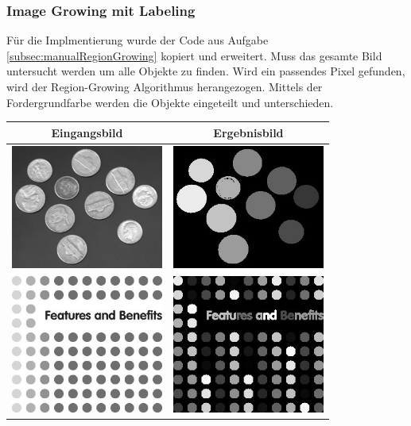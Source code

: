 \documentclass[12pt,german]{article}
\begin{document}
\subsubsection{Image Growing mit Labeling}
Für die Implmentierung wurde der Code aus Aufgabe \ref{subsec:manualRegionGrowing} kopiert und erweitert. Muss das gesamte Bild untersucht werden um alle Objekte zu finden. Wird ein passendes Pixel gefunden, wird der Region-Growing Algorithmus herangezogen. Mittels der Fordergrundfarbe werden die Objekte eingeteilt und unterschieden.

\begin{table}[H]
  \centering
  \begin{tabular}{| c | c | }
    \hline
    Eingangsbild & Ergebnisbild \\
    \hline
    \includegraphics[width=5cm]{../TestData/coins.jpg}  & \includegraphics[width=5cm]{../TestData/coins_result.jpg}\\
	\hline
	\includegraphics[width=5cm]{../TestData/dots.jpg}  & \includegraphics[width=5cm]{../TestData/dots_result.jpg}\\

\end{tabular}
\end{table}
\end{document}
